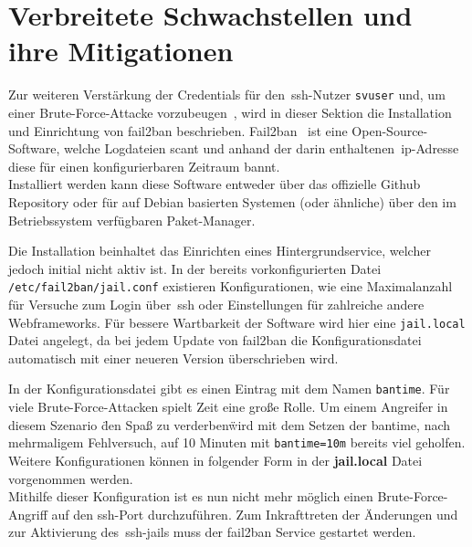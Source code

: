 
\section{Verbreitete Schwachstellen und ihre Mitigationen}\label{sec:bekannte-schwachstellen-und-ihre-mitegationen}
Zur weiteren Verstärkung der Credentials für den~\gls{ssh}-Nutzer \texttt{svuser} und, um einer Brute-Force-Attacke vorzubeugen~\cite{rasp-vuln-prev},
wird in dieser Sektion die Installation und Einrichtung von fail2ban beschrieben.
Fail2ban~\cite{fail2ban} ist eine Open-Source-Software, welche Logdateien scant und anhand der darin enthaltenen~\gls{ip}-Adresse diese für einen konfigurierbaren
Zeitraum bannt. \\
Installiert werden kann diese Software entweder über das offizielle Github Repository oder für auf Debian basierten Systemen (oder ähnliche) über den im
Betriebssystem verfügbaren Paket-Manager.


Die Installation beinhaltet das Einrichten eines Hintergrundservice, welcher jedoch initial nicht aktiv ist.
In der bereits vorkonfigurierten Datei \texttt{/etc/fail2ban/jail.conf} existieren Konfigurationen, wie
eine Maximalanzahl für Versuche zum Login über~\gls{ssh} oder Einstellungen für zahlreiche andere Webframeworks.
Für bessere Wartbarkeit der Software wird hier eine \texttt{jail.local} Datei angelegt, da bei jedem Update von fail2ban die Konfigurationsdatei automatisch mit einer
neueren Version überschrieben wird.

\blankline
In der Konfigurationsdatei gibt es einen Eintrag mit dem Namen \texttt{bantime}.
Für viele Brute-Force-Attacken spielt Zeit eine große Rolle.
Um einem Angreifer in diesem Szenario \"den Spaß zu verderben\" wird mit dem Setzen der bantime, nach mehrmaligem Fehlversuch, auf 10 Minuten mit \texttt{bantime=10m}
bereits viel geholfen.
Weitere Konfigurationen können in folgender Form in der \textbf{jail.local} Datei vorgenommen werden.\\

Mithilfe dieser Konfiguration ist es nun nicht mehr möglich einen Brute-Force-Angriff auf den \gls{ssh}-Port durchzuführen.
Zum Inkrafttreten der Änderungen und zur Aktivierung des~\gls{ssh}-jails muss der fail2ban Service gestartet werden.
